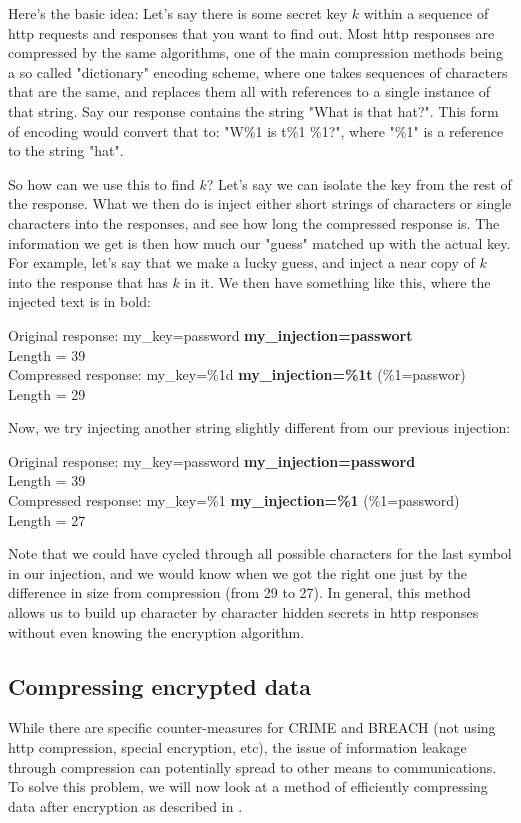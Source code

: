 \documentclass[11pt]{article}
\begin{document}
Here's the basic idea: 
Let's say there is some secret key $k$ within a sequence of http requests and responses that 
you want to find out. Most http responses are compressed by the same algorithms, one of the 
main compression methods being a so called "dictionary" encoding scheme, where one takes sequences 
of characters that are the same, and replaces them all with references to a single instance of that string. 
Say our response contains the string "What is that hat?". This form of encoding would convert that to: 
"W\%1 is t\%1 \%1?", where "\%1" is a reference to the string "hat". 

So how can we use this to find $k$? Let's say we can isolate the key from the rest of the response. 
What we then do is inject either short strings of characters or single characters into the responses, and see how long 
the compressed response is. The information we get is then how much our "guess" matched up with the actual key. 
For example, let's say that we make a lucky guess, and inject a near copy of $k$ into the response that has $k$ in it. 
We then have something like this, where the injected text is in bold:
\begin{center}
	Original response: my\_key=password \textbf{my\_injection=passwort}\\
	Length = 39\\
	Compressed response: my\_key=\%1d \textbf{my\_injection=\%1t} (\%1=passwor)\\
	Length = 29\\
\end{center}
Now, we try injecting another string slightly different from our previous injection:
\begin{center}
	Original response: my\_key=password \textbf{my\_injection=password}\\
	Length = 39\\
	Compressed response: my\_key=\%1 \textbf{my\_injection=\%1} (\%1=password)\\
	Length = 27\\
\end{center}
Note that we could have cycled through all possible characters for the last symbol in our injection, 
and we would know when we got the right one just by the difference in size from compression (from 29 to 27). 
In general, this method allows us to build up character by character hidden secrets in http responses 
without even knowing the encryption algorithm. 

\subsection{Compressing encrypted data}\label{compress-encrypt-subsect}
While there are specific counter-measures for CRIME and BREACH (not using http compression, special encryption, etc), 
the issue of information leakage through compression can potentially spread to other means to communications. 
To solve this problem, we will now look at a method of efficiently compressing data after encryption as described in \cite{johnson}. 
\end{document}
